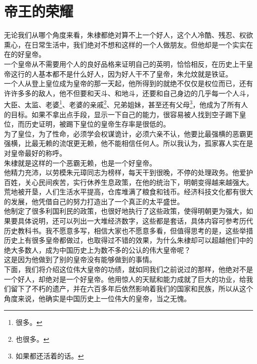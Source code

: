 \fi
\newpage
\section{帝王的荣耀}
\ifnum{}
	\begin{multicols}{\theparacolNo}
\fi
无论我们从哪个角度来看，朱棣都绝对算不上一个好人，这个人冷酷、残忍、权欲熏心，在日常生活中，我们绝对不想和这样的一个人做朋友。但他却是一个实实在在的好皇帝。\\

一个皇帝从不需要用个人的良好品格来证明自己的英明，恰恰相反，在历史上干皇帝这行的人基本都不是什么好人，因为好人干不了皇帝，朱允炆就是铁证。\\

一个人从登上皇位成为皇帝的那一天起，他所得到的就绝不仅仅是权位而已，还有许许多多的敌人，他不但要和天斗、和地斗，还要和自己身边的几乎每一个人斗，大臣、太监、老婆\footnote{很多。}、老婆的亲戚\footnote{也很多。}、兄弟姐妹，甚至还有父母\footnote{如果都还活着的话。}，他成为了所有人的目标。如果不拿出点手段，显示一下自己的能力，很容易被人找到空子踢下皇位，而历史证明，被踢下皇位的皇帝生存率是很低的。\\

为了皇位，为了性命，必须学会权谋诡计，必须六亲不认，他要比最强横的恶霸更强横，比最无赖的流氓更无赖，他不能相信任何人。所以我认为，孤家寡人实在是对皇帝最好的称呼。\\

朱棣就是这样的一个恶霸无赖，也是一个好皇帝。\\

他精力充沛，以劳模朱元璋同志为榜样，每天干到很晚，不停的处理政务。他爱护百姓，关心民间疾苦，实行休养生息政策，在他的统治下，明朝变得越来越强大。荒地被开垦，人们生活水平提高，仓库堆满了粮食和钱币。经济科技文化都有很大的发展，他凭借自己的努力打造出了一个真正的太平盛世。\\

他制定了很多利国利民的政策，也很好地执行了这些政策，使得明朝更为强大，如果要具体说明，还可以列出一大堆经济数字，这些都是套话，具体内容可参考历代历史教科书。我不愿意多写，相信大家也不愿意多看，但值得思考的是，这些举措历史上有很多皇帝都做过，也取得过不错的效果，为什么朱棣却可以超越他们中的绝大多数人，成为中国历史上为数不多的公认的伟大皇帝呢？\\

这是因为他做到了别的皇帝没有能够做到的事情。\\

下面，我们将介绍这位伟大皇帝的功绩，就如同我们之前说过的那样，他绝对不是一个好人，却绝对是一个好皇帝。他用惊人的天赋和能力成就了巨大的功业，给我们留下了不朽的遗产，并在六百多年后依然影响着我们的国家和民族，所以从这个角度来说，他确实是中国历史上一位伟大的皇帝，当之无愧。\\


\end{multicols}
